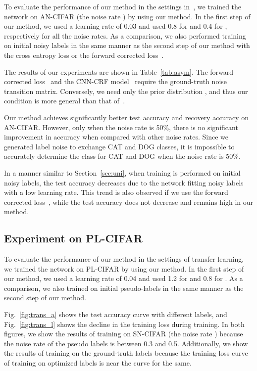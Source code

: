 \documentclass[10pt,twocolumn,letterpaper]{article}
\newcommand{\Tref}[1]{Table~\ref{#1}}
\newcommand{\Fref}[1]{Fig.~\ref{#1}}
\newcommand{\Sref}[1]{Section~\ref{#1}}
\begin{document}
To evaluate the performance of our method in the settings in~\cite{patrini2016making}, we trained the network on AN-CIFAR (the noise rate ) by using our method.
In the first step of our method, we used a learning rate of 0.03 and used 0.8 for  and 0.4 for , respectively for all the noise rates.
As a comparison, we also performed training on initial noisy labels in the same manner as the second step of our method with the cross entropy loss or the forward corrected loss~\cite{patrini2016making}.

The results of our experiments are shown in \Tref{tab:asym}.
The forward corrected loss~\cite{patrini2016making} and the CNN-CRF model~\cite{vahdat2017toward} require the ground-truth noise transition matrix. Conversely, we need only the prior distribution , and thus our condition is more general than that of~\cite{patrini2016making, vahdat2017toward}.

Our method achieves significantly better test accuracy and recovery accuracy on AN-CIFAR.
However, only when the noise rate is 50\%, there is no significant improvement in accuracy when compared with other noise rates. Since we generated label noise to exchange CAT and DOG classes, it is impossible to accurately determine the class for CAT and DOG when the noise rate is 50\%.

In a manner similar to \Sref{sec:uni}, when training is performed on initial noisy labels, the test accuracy decreases due to the network fitting noisy labels with a low learning rate. This trend is also observed if we use the forward corrected loss~\cite{patrini2016making}, while the test accuracy does not decrease and remains high in our method.

\subsection{Experiment on PL-CIFAR}\label{sec:pl}
To evaluate the performance of our method in the settings of transfer learning, we trained the network on PL-CIFAR by using our method. In the first step of our method, we used a learning rate of 0.04 and used 1.2 for  and 0.8 for . As a comparison, we also trained on initial pseudo-labels in the same manner as the second step of our method.

\Fref{fig:trans_a} shows the test accuracy curve with different labels, and \Fref{fig:trans_l} shows the decline in the training loss during training. In both figures, we show the results of training on SN-CIFAR (the noise rate ) because the noise rate of the pseudo labels is between 0.3 and 0.5. Additionally, we show the results of training on the ground-truth labels because the training loss curve of training on optimized labels is near the curve for the same.
\end{document}
